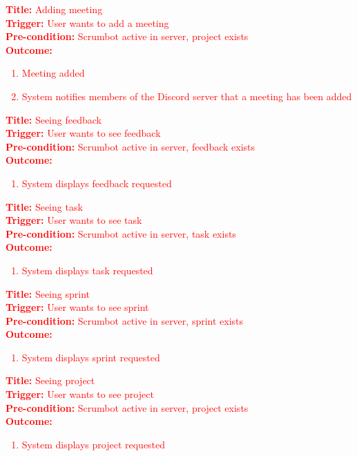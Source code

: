 \documentclass[12pt, titlepage]{article}
\begin{document}
\noindent \textcolor{red}{\textbf{Title: }Adding meeting}\\
\textcolor{red}{\textbf{Trigger: }User wants to add a meeting}\\
\textcolor{red}{\textbf{Pre-condition: }Scrumbot active in server, project exists}\\
\textcolor{red}{\textbf{Outcome: }}
\textcolor{red}{
\begin{enumerate}
    \item Meeting added
    \item System notifies members of the Discord server that a meeting has been added
\end{enumerate}
}

\noindent \textcolor{red}{\textbf{Title: }Seeing feedback}\\
\textcolor{red}{\textbf{Trigger: }User wants to see feedback}\\
\textcolor{red}{\textbf{Pre-condition: }Scrumbot active in server, feedback exists}\\
\textcolor{red}{\textbf{Outcome: }}
\textcolor{red}{
\begin{enumerate}
    \item System displays feedback requested
\end{enumerate}
}

\noindent \textcolor{red}{\textbf{Title: }Seeing task}\\
\textcolor{red}{\textbf{Trigger: }User wants to see task}\\
\textcolor{red}{\textbf{Pre-condition: }Scrumbot active in server, task exists}\\
\textcolor{red}{\textbf{Outcome: }}
\textcolor{red}{
\begin{enumerate}
    \item System displays task requested
\end{enumerate}
}

\noindent \textcolor{red}{\textbf{Title: }Seeing sprint}\\
\textcolor{red}{\textbf{Trigger: }User wants to see sprint}\\
\textcolor{red}{\textbf{Pre-condition: }Scrumbot active in server, sprint exists}\\
\textcolor{red}{\textbf{Outcome: }}
\textcolor{red}{
\begin{enumerate}
    \item System displays sprint requested
\end{enumerate}
}

\noindent \textcolor{red}{\textbf{Title: }Seeing project}\\
\textcolor{red}{\textbf{Trigger: }User wants to see project}\\
\textcolor{red}{\textbf{Pre-condition: }Scrumbot active in server, project exists}\\
\textcolor{red}{\textbf{Outcome: }}
\textcolor{red}{
\begin{enumerate}
    \item System displays project requested
\end{enumerate}
}
\end{document}
